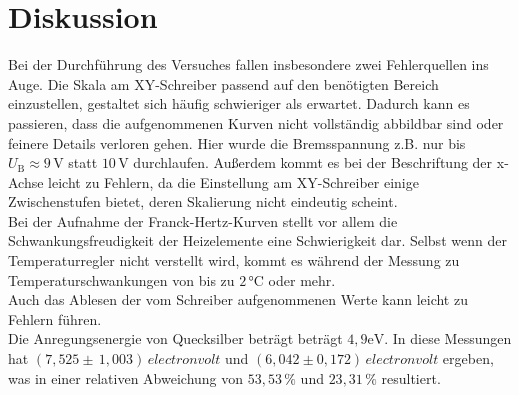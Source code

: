 \section{Diskussion}

Bei der Durchführung des Versuches fallen insbesondere zwei Fehlerquellen ins Auge.
Die Skala am XY-Schreiber passend auf den benötigten Bereich einzustellen, gestaltet sich häufig schwieriger als erwartet.
Dadurch kann es passieren, dass die aufgenommenen Kurven nicht vollständig abbildbar sind oder feinere Details verloren gehen.
Hier wurde die Bremsspannung z.B. nur bis $U_\text{B} \approx 9 \,\unit{\volt}$ statt $10 \,\unit{\volt}$ durchlaufen.
Außerdem kommt es bei der Beschriftung der x-Achse leicht zu Fehlern, da die Einstellung am XY-Schreiber einige Zwischenstufen bietet, deren Skalierung nicht eindeutig scheint. \\

Bei der Aufnahme der Franck-Hertz-Kurven stellt vor allem die Schwankungsfreudigkeit der Heizelemente eine Schwierigkeit dar.
Selbst wenn der Temperaturregler nicht verstellt wird, kommt es während der Messung zu Temperaturschwankungen von bis zu $2 \,\unit{\celsius}$ oder mehr. \\

Auch das Ablesen der vom Schreiber aufgenommenen Werte kann leicht zu Fehlern führen. \\

Die Anregungsenergie von Quecksilber beträgt \cite{ap09} beträgt $4,9 \unit{\electronvolt}$. In diese Messungen hat $\left( 7,525 \pm \, 1,003\right) \, \unit{electronvolt}$ und  $ \left(6,042 \pm 0,172 \right)\, \unit{electronvolt}$ ergeben, was in einer relativen Abweichung von $53,53 \, \%$ und $23,31 \, \%$ resultiert.